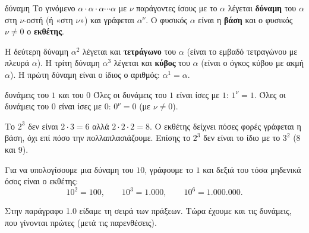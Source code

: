 
\begin{orismos}{δύναμη}
Το γινόμενο $\alpha\cdot\alpha\cdot\alpha\cdots\alpha$ με $\nu$ παράγοντες ίσους με το $\alpha$ λέγεται \textbf{δύναμη} του $\alpha$ στη $\nu$-οστή (ή «στη $\nu$») και γράφεται $\alpha^{\nu}$. Ο φυσικός $\alpha$ είναι η \textbf{βάση} και ο φυσικός $\nu\neq 0$ ο \textbf{εκθέτης}.
\end{orismos}

\begin{center}
\end{center}

Η δεύτερη δύναμη $\alpha^2$ λέγεται και \textbf{τετράγωνο} του $\alpha$ (είναι το εμβαδό τετραγώνου με πλευρά $\alpha$). Η τρίτη δύναμη $\alpha^3$ λέγεται και \textbf{κύβος} του $\alpha$ (είναι ο όγκος κύβου με ακμή $\alpha$). Η πρώτη δύναμη είναι ο ίδιος ο αριθμός: $\alpha^1=\alpha$.

\begin{idiotita}{δυνάμεις του $1$ και του $0$}
Όλες οι δυνάμεις του $1$ είναι ίσες με $1$: $1^{\nu}=1$. Όλες οι δυνάμεις του $0$ είναι ίσες με $0$: $0^{\nu}=0$ (με $\nu\neq 0$).
\end{idiotita}

\begin{prosoxi}
Το $2^3$ δεν είναι $2\cdot 3=6$ αλλά $2\cdot 2\cdot 2=8$. Ο εκθέτης δείχνει πόσες φορές γράφεται η βάση, όχι επί πόσο την πολλαπλασιάζουμε. Επίσης το $2^3$ δεν είναι το ίδιο με το $3^2$ ($8$ και $9$).
\end{prosoxi}


Για να υπολογίσουμε μια δύναμη του $10$, γράφουμε το $1$ και δεξιά του τόσα μηδενικά όσος είναι ο εκθέτης:
$$10^2=100,\qquad 10^3=1.000,\qquad 10^6=1.000.000.$$


Στην παράγραφο 1.0 είδαμε τη σειρά των πράξεων. Τώρα έχουμε και τις δυνάμεις, που γίνονται πρώτες (μετά τις παρενθέσεις).

